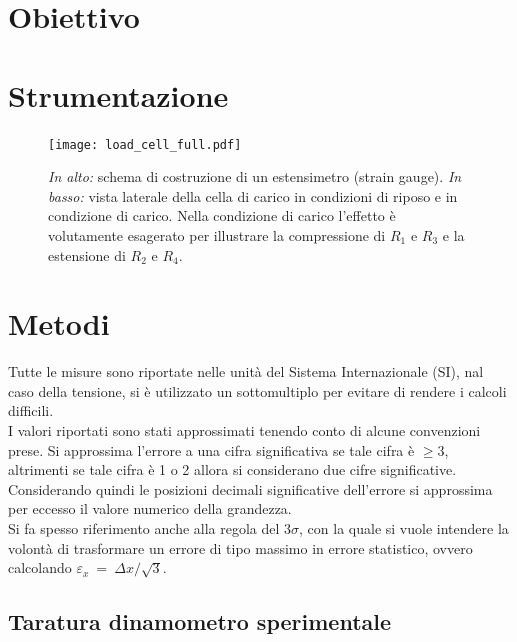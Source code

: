 \documentclass[italian, a4paper, 10pt, twocolumn]{../../style/lab_unige}
\newcommand{\treSigma}{$3\sigma$}
\newcommand{\mstdErr}[1]{\varepsilon_{#1}}
\begin{document}

    \section{Obiettivo}
    \label{section:aim}


    \section{Strumentazione}
    \label{section:strument}

    \begin{figure}
        \centering
        \texttt{[image: load\_cell\_full.pdf]}
        \caption{\textit{In alto: } schema di costruzione di un estensimetro (strain gauge). \textit{In basso: } vista laterale della cella di carico in condizioni di riposo e in condizione di carico. Nella condizione di carico l'effetto è volutamente esagerato per illustrare la compressione di $R_1$ e $R_3$ e la estensione di $R_2$ e $R_4$.}
        \label{figure:load_cell}
    \end{figure}

    \section{Metodi}
    \label{section:methods}

    Tutte le misure sono riportate nelle unità del Sistema Internazionale (SI), nal caso della tensione, si è utilizzato un sottomultiplo per evitare di rendere i calcoli difficili.\\
    I valori riportati sono stati approssimati tenendo conto di alcune convenzioni prese. Si approssima l'errore a una cifra significativa se tale cifra è $\geqslant3$, altrimenti se tale cifra è 1 o 2 allora si considerano due cifre significative. Considerando quindi le posizioni decimali significative dell'errore si approssima per eccesso il valore numerico della grandezza.\\
    Si fa spesso riferimento anche alla regola del \treSigma, con la quale si vuole intendere la volontà di trasformare un errore di tipo massimo in errore statistico, ovvero calcolando $\mstdErr{x}~=~\Delta x/\sqrt{3}$.\\

    \subsection{Taratura dinamometro sperimentale}
\end{document}
